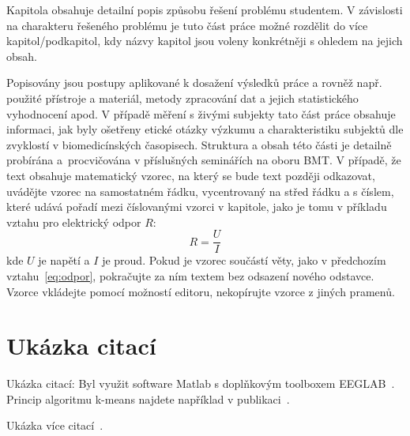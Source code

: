 Kapitola obsahuje detailní popis způsobu řešení problému studentem. 
V závislosti na charakteru řešeného problému je tuto část práce možné rozdělit do více kapitol/podkapitol, kdy názvy kapitol jsou voleny konkrétněji s ohledem na jejich obsah.

Popisovány jsou postupy aplikované k dosažení výsledků práce a rovněž např. použité přístroje a materiál, metody zpracování dat a jejich statistického vyhodnocení apod. 
V případě měření s živými subjekty tato část práce obsahuje informaci, jak byly ošetřeny etické otázky výzkumu a charakteristiku subjektů dle zvyklostí v biomedicínských časopisech.
Struktura a obsah této části je detailně probírána a~procvičována v příslušných seminářích na oboru BMT.
V případě, že text obsahuje matematický vzorec, na který se bude text později odkazovat, uvádějte vzorec na samostatném řádku, vycentrovaný na střed řádku a s číslem, které udává pořadí mezi číslovanými vzorci v kapitole, jako je tomu v příkladu vztahu pro elektrický odpor $R$:
\begin{equation}
	\label{eq:odpor}
	R = \frac{U}{I}
\end{equation}
kde $U$ je napětí a $I$ je proud. 
Pokud je vzorec součástí věty, jako v předchozím vztahu~\ref{eq:odpor}, pokračujte za ním textem bez odsazení nového odstavce. 
Vzorce vkládejte pomocí možností editoru, nekopírujte vzorce z jiných pramenů.  

\section{Ukázka citací}
Ukázka citací:
Byl využit software Matlab \cite{MATLAB} s doplňkovým toolboxem EEGLAB~\cite{eeglab}. 
Princip algoritmu k-means najdete například v publikaci~\cite{Krajca2011}.

Ukázka více citací~\cite{MATLAB, eeglab}.